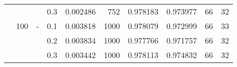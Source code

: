 \begin{table}[h!]
\begin{tabular}{llllrrrrrr}
          &     &   & 0.3 &  0.002486 &     752 &     0.978183 &     0.973977 &          66 &        32 \\
          & 100 & - & 0.1 &  0.003818 &    1000 &     0.978079 &     0.972999 &          66 &        33 \\
          &     &   & 0.2 &  0.003834 &    1000 &     0.977766 &     0.971757 &          66 &        32 \\
          &     &   & 0.3 &  0.003442 &    1000 &     0.978113 &     0.974832 &          66 &        32 \\
\bottomrule
\end{tabular}
\end{table}
